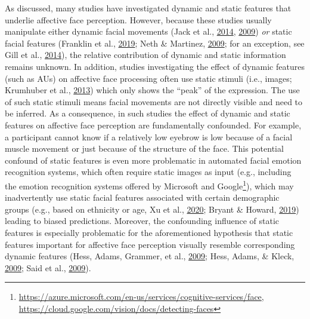 \documentclass[12pt,american,a4paper,oneside,]{memoir} %
\let\rmarkdownfootnote\footnote%
\def\footnote{\protect\rmarkdownfootnote}
\begin{document}
As discussed, many studies have investigated dynamic and static features that underlie affective face perception. However, because these studies usually manipulate either dynamic facial movements (Jack et al., \protect\hyperlink{ref-Jack2014-ku}{2014}, \protect\hyperlink{ref-Jack2009-yy}{2009}) \emph{or} static facial features (Franklin et al., \protect\hyperlink{ref-Franklin2019-qo}{2019}; Neth \& Martinez, \protect\hyperlink{ref-Neth2009-eh}{2009}; for an exception, see Gill et al., \protect\hyperlink{ref-Gill2014-hx}{2014}), the relative contribution of dynamic and static information remains unknown. In addition, studies investigating the effect of dynamic features (such as AUs) on affective face processing often use static stimuli (i.e., images; Krumhuber et al., \protect\hyperlink{ref-Krumhuber2013-qi}{2013}) which only shows the ``peak'' of the expression. The use of such static stimuli means facial movements are not directly visible and need to be inferred. As a consequence, in such studies the effect of dynamic and static features on affective face perception are fundamentally confounded. For example, a participant cannot know if a relatively low eyebrow is low because of a facial muscle movement or just because of the structure of the face. This potential confound of static features is even more problematic in automated facial emotion recognition systems, which often require static images as input (e.g., including the emotion recognition systems offered by Microsoft and Google\footnote{\url{https://azure.microsoft.com/en-us/services/cognitive-services/face}, \url{https://cloud.google.com/vision/docs/detecting-faces}}), which may inadvertently use static facial features associated with certain demographic groups (e.g., based on ethnicity or age, Xu et al., \protect\hyperlink{ref-Xu2020-jd}{2020}; Bryant \& Howard, \protect\hyperlink{ref-Bryant2019-sg}{2019}) leading to biased predictions. Moreover, the confounding influence of static features is especially problematic for the aforementioned hypothesis that static features important for affective face perception visually resemble corresponding dynamic features (Hess, Adams, Grammer, et al., \protect\hyperlink{ref-Hess2009-jz}{2009}; Hess, Adams, \& Kleck, \protect\hyperlink{ref-Hess2009-xo}{2009}; Said et al., \protect\hyperlink{ref-Said2009-tf}{2009}).
\end{document}
